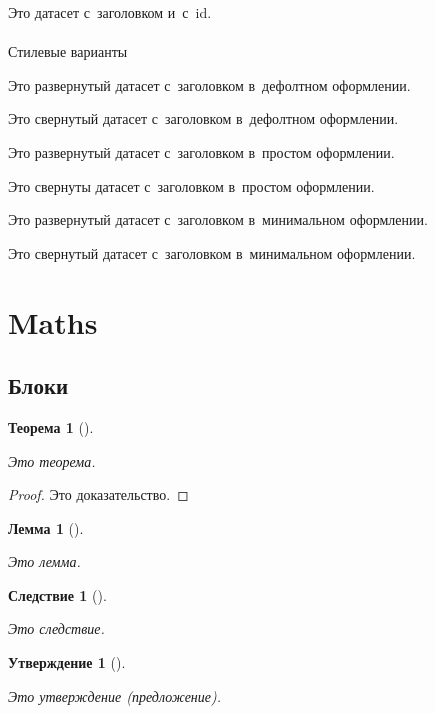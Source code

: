 \documentclass[
  russian,
  letterpaper,
  DIV=11,
  numbers=noendperiod,
  oneside]{scrreprt}
\makeatletter
\let\oldparagraph\paragraph
\renewcommand{\paragraph}{
    \@ifstar
      \xxxParagraphStar
      \xxxParagraphNoStar
  }
\newcommand{\xxxParagraphStar}[1]{\oldparagraph*{#1}\mbox{}}
\newcommand{\xxxParagraphNoStar}[1]{\oldparagraph{#1}\mbox{}}
\theoremstyle{definition}
\theoremstyle{plain}
\newtheorem{proposition}{Утверждение}[chapter]
\theoremstyle{plain}
\newtheorem{lemma}{Лемма}[chapter]
\theoremstyle{definition}
\theoremstyle{plain}
\newtheorem{theorem}{Теорема}[chapter]
\theoremstyle{plain}
\theoremstyle{plain}
\newtheorem{corollary}{Следствие}[chapter]
\theoremstyle{plain}
\theoremstyle{definition}
\theoremstyle{remark}
\makeatother
\begin{document}
\label{dts-debug-title-id}
Это датасет с~заголовком и~с~id.

\paragraph{Стилевые варианты}\label{debug-callout-dataset-appearance}

Это развернутый датасет с~заголовком в~дефолтном оформлении.

Это свернутый датасет с~заголовком в~дефолтном оформлении.

Это развернутый датасет с~заголовком в~простом оформлении.

Это свернуты датасет с~заголовком в~простом оформлении.

Это развернутый датасет с~заголовком в~минимальном оформлении.

Это свернутый датасет с~заголовком в~минимальном оформлении.

\section{Maths}\label{debug-maths}

\subsection{Блоки}\label{debug-maths-blocks}

\begin{theorem}[]\protect\hypertarget{thm-debug}{}\label{thm-debug}

Это теорема.

\end{theorem}

\begin{proof}
Это доказательство.
\end{proof}

\begin{lemma}[]\protect\hypertarget{lem-debug}{}\label{lem-debug}

Это лемма.

\end{lemma}

\begin{corollary}[]\protect\hypertarget{cor-debug}{}\label{cor-debug}

Это следствие.

\end{corollary}

\begin{proposition}[]\protect\hypertarget{prp-debug}{}\label{prp-debug}

Это утверждение (предложение).

\end{proposition}
\end{document}
